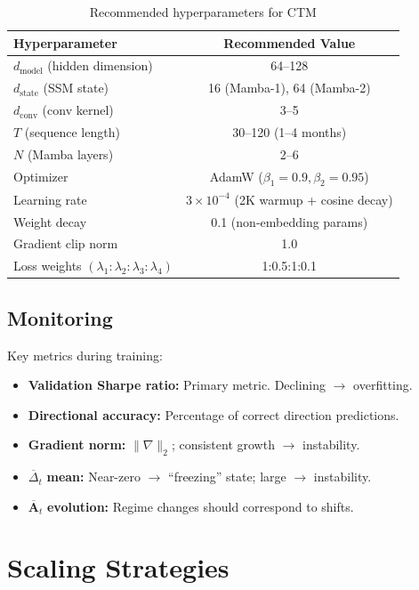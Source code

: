 \documentclass[11pt,a4paper]{article}
\begin{document}
\begin{table}[h]
\centering
\caption{Recommended hyperparameters for CTM}
\label{tab:hparams}
\begin{tabular}{lc}
\toprule
Hyperparameter & Recommended Value \\
\midrule
$d_{\text{model}}$ (hidden dimension) & 64--128 \\
$d_{\text{state}}$ (SSM state) & 16 (Mamba-1), 64 (Mamba-2) \\
$d_{\text{conv}}$ (conv kernel) & 3--5 \\
$T$ (sequence length) & 30--120 (1--4 months) \\
$N$ (Mamba layers) & 2--6 \\
Optimizer & AdamW ($\beta_1 = 0.9, \beta_2 = 0.95$) \\
Learning rate & $3 \times 10^{-4}$ (2K warmup + cosine decay) \\
Weight decay & 0.1 (non-embedding params) \\
Gradient clip norm & 1.0 \\
Loss weights $(\lambda_1:\lambda_2:\lambda_3:\lambda_4)$ & 1:0.5:1:0.1 \\
\bottomrule
\end{tabular}
\end{table}

\subsection{Monitoring}

Key metrics during training:
\begin{itemize}
  \item \textbf{Validation Sharpe ratio:} Primary metric. Declining $\to$ overfitting.
  \item \textbf{Directional accuracy:} Percentage of correct direction predictions.
  \item \textbf{Gradient norm:} $\| \nabla \|_2$; consistent growth $\to$ instability.
  \item $\overline{\Delta}_t$ \textbf{mean:} Near-zero $\to$ ``freezing'' state; large $\to$ instability.
  \item $\overline{\mathbf{A}}_t$ \textbf{evolution:} Regime changes should correspond to shifts.
\end{itemize}

\section{Scaling Strategies}
\end{document}

